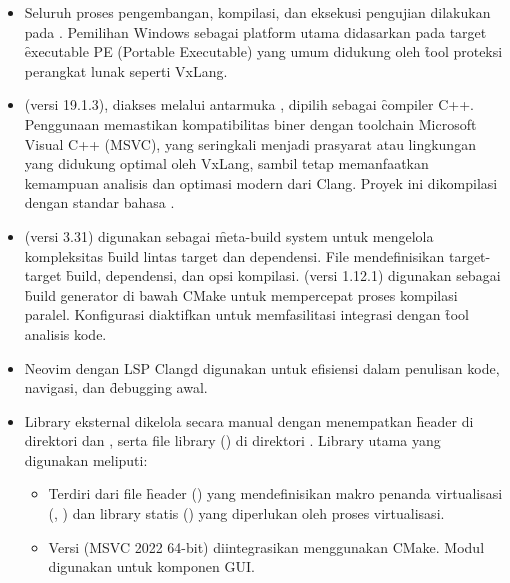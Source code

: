 \begin{itemize}
	\item {} Seluruh proses pengembangan, kompilasi, dan eksekusi pengujian dilakukan pada . Pemilihan Windows sebagai platform utama didasarkan pada target \f{executable} PE (Portable Executable) yang umum didukung oleh \f{tool} proteksi perangkat lunak seperti VxLang.
	\item {}  (versi 19.1.3), diakses melalui antarmuka , dipilih sebagai \f{compiler} C++. Penggunaan  memastikan kompatibilitas biner dengan toolchain Microsoft Visual C++ (MSVC), yang seringkali menjadi prasyarat atau lingkungan yang didukung optimal oleh VxLang, sambil tetap memanfaatkan kemampuan analisis dan optimasi modern dari Clang. Proyek ini dikompilasi dengan standar bahasa .
	\item {}  (versi 3.31) digunakan sebagai \f{meta-build system} untuk mengelola kompleksitas \f{build} lintas target dan dependensi. File  mendefinisikan target-target \f{build}, dependensi, dan opsi kompilasi.  (versi 1.12.1) digunakan sebagai \f{build generator} di bawah CMake untuk mempercepat proses kompilasi paralel. Konfigurasi  diaktifkan untuk memfasilitasi integrasi dengan \f{tool} analisis kode.
	\item {} Neovim dengan LSP Clangd digunakan untuk efisiensi dalam penulisan kode, navigasi, dan \f{debugging} awal.
	\item {} Library eksternal dikelola secara manual dengan menempatkan \f{header} di direktori  dan , serta file library () di direktori . Library utama yang digunakan meliputi:
	      \begin{itemize}
		      \item {} Terdiri dari file \f{header} () yang mendefinisikan makro penanda virtualisasi (, ) dan library statis () yang diperlukan oleh proses virtualisasi.
		      \item {} Versi  (MSVC 2022 64-bit) diintegrasikan menggunakan  CMake. Modul  digunakan untuk komponen GUI.

\end{itemize}
\end{itemize}
